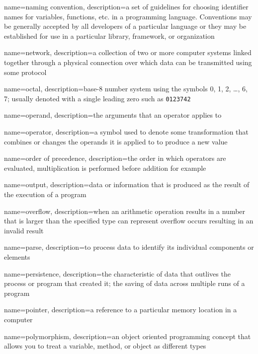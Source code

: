 {
  name=naming convention,
  description={a set of guidelines for choosing identifier names for variables, functions, etc. in a programming language.  Conventions may be generally accepted by all developers of a particular language or they may be established for use in a particular library, framework, or organization}
}

{
  name=network,
  description={a collection of two or more computer systems linked together through a physical connection over which data can be transmitted using some protocol}
}

{
  name=octal,
  description={base-8 number system using the symbols 0, 1, 2, \ldots, 6, 7; usually denoted with a single leading zero such as
\texttt{0123742}}
}


{
  name=operand,
  description={the arguments that an operator applies to}
}

{
  name=operator,
  description={a symbol used to denote some transformation that combines or changes the operands it is applied to to produce a new value}
}

{
  name=order of precedence,
  description={the order in which operators are evaluated, multiplication is performed before addition for example}
}

{
  name=output,
  description={data or information that is produced as the result of the execution of a program}
}

{
  name=overflow,
  description={when an arithmetic operation results in a number that is larger than the specified type can represent overflow occurs resulting in an invalid result}
}

{
  name=parse,
  description={to process data to identify its individual components or elements}
}

{
  name=persistence,
  description={the characteristic of data that outlives the process or program that created it; the saving of data across multiple runs of a program}
}

{
  name=pointer,
  description={a reference to a particular memory location in a computer}
}

{
  name=polymorphism,
  description={an object oriented programming concept that allows you to treat a variable, method, or object as different types}
}

